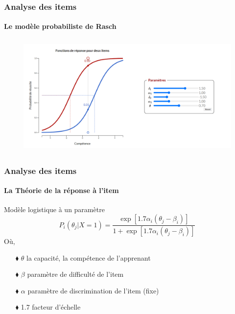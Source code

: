 \documentclass[aspectratio=169,professionalfonts, 12pt]{beamer}
\begin{document}
\begin{frame}
  \frametitle{Analyse des items}
  \framesubtitle{Le modèle probabiliste de Rasch}
  \justifying 
  \begin{minipage}{\textwidth}
  \begin{figure}[H]
      \includegraphics[height=6cm]{images/etat_art/rasch_figure.png}
  \end{figure}
  \end{minipage}
\end{frame}


\begin{frame}
  \frametitle{Analyse des items}
  \framesubtitle{La Théorie de la réponse à l'item}
  \justifying
  \begin{minipage}{\textwidth}
  \begin{block}{Modèle logistique à un paramètre}
    \begin{equation}
      P_{i}(\theta_{j} | X=1) = \frac{\exp \left[ 1.7 \alpha_{i}(\theta_{j}-\beta_{i}) \right]  }{1+ \exp \left[1.7 \alpha_{i}(\theta_{j}-\beta_{i}) \right]  } 
    \end{equation}
    Où, \\
    \begin{itemize}
      \item[$\blacklozenge$] \(\displaystyle \theta \) la capacité, la compétence de l'apprenant 
      \item[$\blacklozenge$] \(\displaystyle \beta \) paramètre de difficulté de l'item
      \item[$\blacklozenge$] \(\displaystyle \alpha \) paramètre de discrimination de l'item (fixe)
      \item[$\blacklozenge$] 1.7 facteur d'échelle 
    \end{itemize}
  \end{block}  
  \end{minipage} 
\end{frame}
\end{document}
